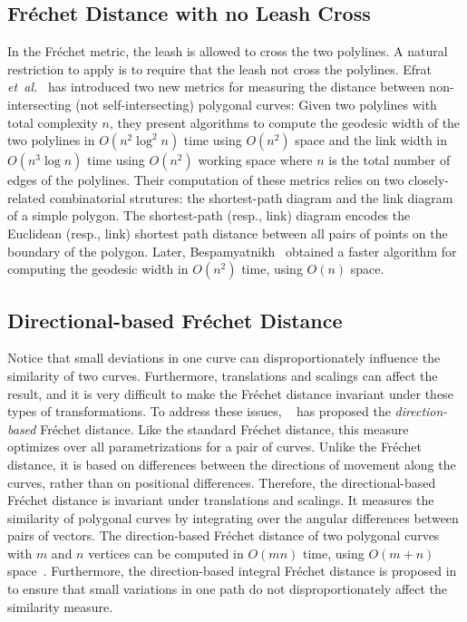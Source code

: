 \documentclass[12pt]{dalthesis}
\newcommand{\etal}{{\em et~al.\/}}
\newcommand{\Frechet}{Fr\'echet }
\begin{document}
\subsection{\Frechet Distance with no Leash Cross}
In the \Frechet metric, the leash is allowed to cross the two polylines.
A natural restriction to apply is to require that the leash not cross the polylines.
Efrat \etal~\cite{GuibasNoCross} has introduced two new metrics 
for measuring the distance between non-intersecting 
(not self-intersecting) polygonal curves:
Given two polylines with total complexity $n$, they 
present algorithms to compute the geodesic 
width of the two polylines in $O(n^2 \log^2 n)$ time 
using $O(n^2)$ space and the link width 
in $O(n^3 \log n)$ time using $O(n^2)$ working space
 where $n$ is the total number of edges of the
 polylines. Their computation of these metrics relies on two 
closely-related combinatorial 
strutures: the shortest-path diagram and the link diagram of a simple polygon.
The shortest-path (resp., link) diagram encodes the
Euclidean (resp., link) shortest path distance between 
all pairs of points on the boundary of the polygon. 
Later, Bespamyatnikh~\cite{BesNoCross} obtained a faster
algorithm for computing the geodesic width in $O(n^2)$ time, using $O(n)$ space.





\subsection{Directional-based \Frechet Distance}
Notice that small deviations in one curve can disproportionately 
influence the similarity of two curves.
Furthermore, translations and scalings can affect the result, 
and it is very difficult to make the \Frechet distance invariant under these
types of transformations.
To address these issues, ~\cite{Dir-FD} has proposed the 
{\em direction-based } \Frechet distance. 
Like the standard \Frechet distance, this measure
optimizes over all parametrizations for a pair of curves. Unlike the \Frechet
distance, it is based on differences between the directions of movement along the
curves, rather than on positional differences. 
Therefore, the directional-based \Frechet distance 
is invariant under translations and scalings.
It measures the similarity of polygonal curves by integrating over 
the angular differences between pairs of vectors.
The direction-based \Frechet distance of two polygonal curves with $m$ and $n$ vertices
can be computed in $O(mn)$ time, using $O(m + n)$ space~\cite{Dir-FD}.
Furthermore, the direction-based integral \Frechet distance is proposed
in \cite{Dir-FD} to ensure that small variations in one path do not disproportionately affect the similarity measure.
\end{document}
